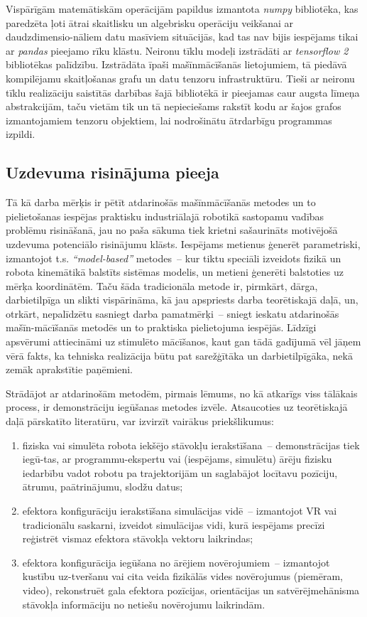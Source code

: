 \documentclass[12pt, a4paper]{article}
\numberwithin{equation}{section} %
\begin{document}
Vispārīgām matemātiskām operācijām papildus izmantota \textit{numpy} \cite{numpy_docs} bibliotēka, kas paredzēta ļoti ātrai skaitlisku un algebrisku operāciju veikšanai ar daudzdimensio-nāliem datu masīviem situācijās, kad tas nav bijis iespējams tikai ar \textit{pandas} pieejamo rīku klāstu. Neironu tīklu modeļi izstrādāti ar \textit{tensorflow 2} \cite{tf_docs} bibliotēkas palīdzību. Izstrādāta īpaši mašīnmācīšanās lietojumiem, tā piedāvā kompilējamu skaitļošanas grafu un datu tenzoru infrastruktūru. Tieši ar neironu tīklu realizāciju saistītās darbības šajā bibliotēkā ir pieejamas caur augsta līmeņa abstrakcijām, taču vietām tik un tā nepieciešams rakstīt kodu ar šajos grafos izmantojamiem tenzoru objektiem, lai nodrošinātu ātrdarbīgu programmas izpildi.

\subsection{Uzdevuma risinājuma pieeja}

Tā kā darba mērķis ir pētīt atdarinošās mašīnmācīšanās metodes un to pielietošanas iespējas praktisku industriālajā robotikā sastopamu vadības problēmu risināšanā, jau no paša sākuma tiek krietni sašaurināts motivējošā uzdevuma potenciālo risinājumu klāsts. Iespējams metienus ģenerēt parametriski, izmantojot t.s. \textit{``model-based''} metodes~-- kur tiktu speciāli izveidots fizikā un robota kinemātikā balstīts sistēmas modelis, un metieni ģenerēti balstoties uz mērķa koordinātēm. Taču šāda tradicionāla metode ir, pirmkārt, dārga, darbietilpīga un slikti vispārināma, kā jau apspriests darba teorētiskajā daļā, un, otrkārt, nepalīdzētu sasniegt darba pamatmērķi~-- sniegt ieskatu atdarinošās mašīn-mācīšanās metodēs un to praktiska pielietojuma iespējās. Līdzīgi apsvērumi attiecināmi uz stimulēto mācīšanos, kaut gan tādā gadījumā vēl jāņem vērā fakts, ka tehniska realizācija būtu pat sarežģītāka un darbietilpīgāka, nekā zemāk aprakstītie paņēmieni.

Strādājot ar atdarinošām metodēm, pirmais lēmums, no kā atkarīgs viss tālākais process, ir demonstrāciju iegūšanas metodes izvēle. Atsaucoties uz teorētiskajā daļā pārskatīto literatūru, var izvirzīt vairākus priekšlikumus:

\begin{enumerate}
    \item fiziska vai simulēta robota iekšējo stāvokļu ierakstīšana~-- demonstrācijas tiek iegū-tas, ar programmu-ekspertu vai (iespējams, simulētu) ārēju fizisku iedarbību vadot robotu pa trajektorijām un saglabājot locītavu pozīciju, ātrumu, paātrinājumu, slodžu datus;
    \item efektora konfigurāciju ierakstīšana simulācijas vidē~-- izmantojot VR vai tradicionālu saskarni, izveidot simulācijas vidi, kurā iespējams precīzi reģistrēt vismaz efektora stāvokļa vektoru laikrindas;
    \item efektora konfigurācija iegūšana no ārējiem novērojumiem~-- izmantojot kustību uz-tveršanu vai cita veida fizikālās vides novērojumus (piemēram, video), rekonstruēt gala efektora pozīcijas, orientācijas un satvērējmehānisma stāvokļa informāciju no netiešu novērojumu laikrindām.
\end{enumerate}
\end{document}
